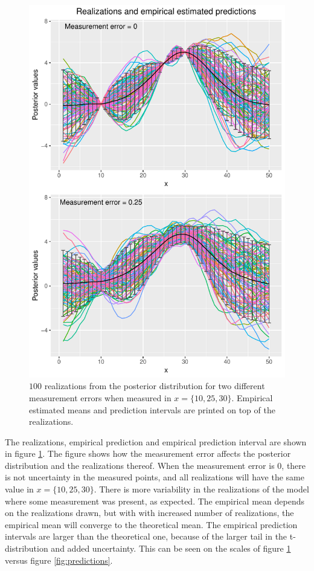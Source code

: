 \begin{figure}
    \centering
    \includegraphics[scale=0.95]{figures/posteriorSamps.pdf}
    \caption{$100$ realizations from the posterior distribution for two different measurement errors when measured in $x = \{10,25,30\}$. Empirical estimated means and prediction intervals are printed on top of the realizations.}
    \label{fig:postSamps}
\end{figure}

The realizations, empirical prediction and empirical prediction interval are shown in figure \ref{fig:postSamps}. The figure shows how the measurement error affects the posterior distribution and the realizations thereof. When the measurement error is $0$, there is not uncertainty in the measured points, and all realizations will have the same value in $x = \{10,25,30\}$. There is more variability in the realizations of the model where some measurement was present, as expected. The empirical mean depends on the realizations drawn, but with with increased number of realizations, the empirical mean will converge to the theoretical mean. The empirical prediction intervals are larger than the theoretical one, because of the larger tail in the t-distribution and added uncertainty. This can be seen on the scales of figure \ref{fig:postSamps} versus figure \ref{fig:predictions}.


